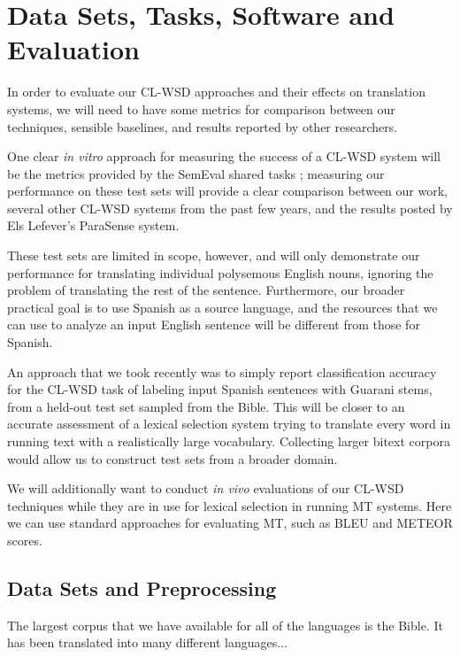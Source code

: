 \chapter{Data Sets, Tasks, Software and Evaluation}
\label{chap:evaluation}

In order to evaluate our CL-WSD approaches and their effects on translation
systems, we will need to have some metrics for comparison between our
techniques, sensible baselines, and results reported by other researchers.

One clear \emph{in vitro} approach for measuring the success of a CL-WSD system
will be the metrics provided by the SemEval shared tasks
\cite{task10}; measuring our performance on these test
sets will provide a clear comparison between our work, several other CL-WSD
systems from the past few years, and the results posted by Els Lefever's
ParaSense system.

These test sets are limited in scope, however, and will only demonstrate our
performance for translating individual polysemous English nouns, ignoring the
problem of translating the rest of the sentence.
Furthermore, our broader practical goal is to use Spanish as a source language,
and the resources that we can use to analyze an input English sentence will be
different from those for Spanish.

An approach that we took recently \cite{rudnick-gasser:2013:HyTra-2013} was to
simply report classification accuracy for the CL-WSD task of labeling input
Spanish sentences with Guarani stems, from a held-out test set sampled from the
Bible.
This will be closer to an accurate assessment of a lexical selection system
trying to translate every word in running text with a realistically large
vocabulary. Collecting larger bitext corpora would allow us to construct test
sets from a broader domain.

We will additionally want to conduct \emph{in vivo} evaluations of our CL-WSD
techniques while they are in use for lexical selection in running MT systems.
Here we can use standard approaches for evaluating MT, such as BLEU and METEOR
scores.

\section{Data Sets and Preprocessing}

The largest corpus that we have available for all of the languages is the
Bible. It has been translated into many different languages...

